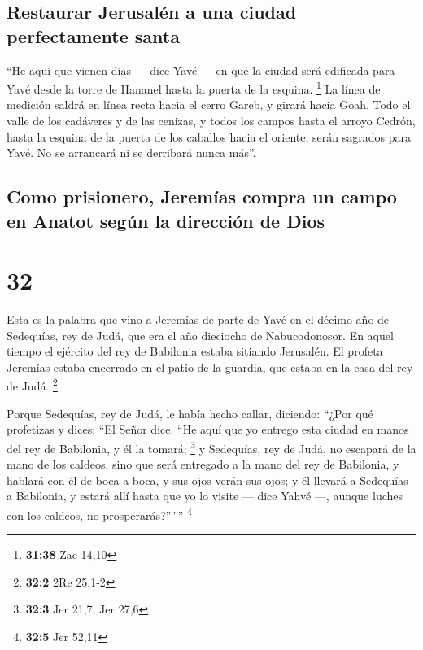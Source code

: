 \hypertarget{restaurar-jerusaluxe9n-a-una-ciudad-perfectamente-santa}{%
\subsection{Restaurar Jerusalén a una ciudad perfectamente
santa}\label{restaurar-jerusaluxe9n-a-una-ciudad-perfectamente-santa}}

 ``He aquí que vienen días --- dice Yavé --- en que la
ciudad será edificada para Yavé desde la torre de Hananel hasta la
puerta de la esquina. \footnote{\textbf{31:38} Zac 14,10}
 La línea de medición saldrá en línea recta hacia el
cerro Gareb, y girará hacia Goah.  Todo el valle de los
cadáveres y de las cenizas, y todos los campos hasta el arroyo Cedrón,
hasta la esquina de la puerta de los caballos hacia el oriente, serán
sagrados para Yavé. No se arrancará ni se derribará nunca más''.

\hypertarget{como-prisionero-jeremuxedas-compra-un-campo-en-anatot-seguxfan-la-direcciuxf3n-de-dios}{%
\subsection{Como prisionero, Jeremías compra un campo en Anatot según la
dirección de
Dios}\label{como-prisionero-jeremuxedas-compra-un-campo-en-anatot-seguxfan-la-direcciuxf3n-de-dios}}

\hypertarget{section-31}{%
\section{32}\label{section-31}}

 Esta es la palabra que vino a Jeremías de parte de Yavé
en el décimo año de Sedequías, rey de Judá, que era el año dieciocho de
Nabucodonosor.  En aquel tiempo el ejército del rey de
Babilonia estaba sitiando Jerusalén. El profeta Jeremías estaba
encerrado en el patio de la guardia, que estaba en la casa del rey de
Judá. \footnote{\textbf{32:2} 2Re 25,1-2}

 Porque Sedequías, rey de Judá, le había hecho callar,
diciendo: ``¿Por qué profetizas y dices: ``El Señor dice: ``He aquí que
yo entrego esta ciudad en manos del rey de Babilonia, y él la tomará;
\footnote{\textbf{32:3} Jer 21,7; Jer 27,6}  y Sedequías,
rey de Judá, no escapará de la mano de los caldeos, sino que será
entregado a la mano del rey de Babilonia, y hablará con él de boca a
boca, y sus ojos verán sus ojos;  y él llevará a Sedequías
a Babilonia, y estará allí hasta que yo lo visite --- dice Yahvé ---,
aunque luches con los caldeos, no prosperarás?''\,'\,'' \footnote{\textbf{32:5}
  Jer 52,11}

